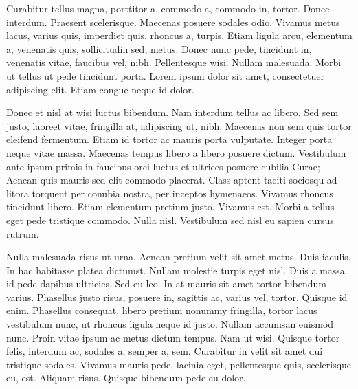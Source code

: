 Curabitur tellus magna, porttitor a, commodo a, commodo in, tortor. Donec
interdum. Praesent scelerisque. Maecenas posuere sodales odio. Vivamus
metus lacus, varius quis, imperdiet quis, rhoncus a, turpis.
Etiam ligula arcu, elementum a, venenatis quis, sollicitudin sed, metus. Donec nunc pede,
tincidunt in, venenatis vitae, faucibus vel, nibh. Pellentesque wisi. Nullam
malesuada. Morbi ut tellus ut pede tincidunt porta. Lorem ipsum dolor sit
amet, consectetuer adipiscing elit. Etiam congue neque id dolor.

Donec et nisl at wisi luctus bibendum. Nam interdum tellus ac libero. Sed
sem justo, laoreet vitae, fringilla at, adipiscing ut, nibh. Maecenas non sem
quis tortor eleifend fermentum. Etiam id tortor ac mauris porta vulputate.
Integer porta neque vitae massa. Maecenas tempus libero a libero posuere
dictum. Vestibulum ante ipsum primis in faucibus orci luctus et ultrices posuere
cubilia Curae; Aenean quis mauris sed elit commodo placerat. Class aptent
taciti sociosqu ad litora torquent per conubia nostra, per inceptos hymenaeos.
Vivamus rhoncus tincidunt libero. Etiam elementum pretium justo. Vivamus
est. Morbi a tellus eget pede tristique commodo. Nulla nisl. Vestibulum sed
nisl eu sapien cursus rutrum.

Nulla malesuada risus ut urna. Aenean pretium velit sit amet metus. Duis
iaculis. In hac habitasse platea dictumst. Nullam molestie turpis eget nisl. Duis
a massa id pede dapibus ultricies. Sed eu leo. In at mauris sit amet tortor
bibendum varius. Phasellus justo risus, posuere in, sagittis ac, varius vel, tortor.
Quisque id enim. Phasellus consequat, libero pretium nonummy fringilla, tortor
lacus vestibulum nunc, ut rhoncus ligula neque id justo. Nullam accumsan
euismod nunc. Proin vitae ipsum ac metus dictum tempus. Nam ut wisi.
Quisque tortor felis, interdum ac, sodales a, semper a, sem. Curabitur in velit
sit amet dui tristique sodales. Vivamus mauris pede, lacinia eget, pellentesque
quis, scelerisque eu, est. Aliquam risus. Quisque bibendum pede eu dolor.
